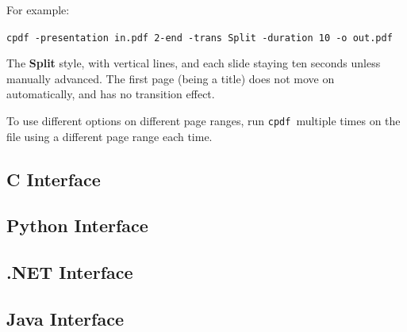 \documentclass{book}
\newcommand{\cpdf}{\texttt{cpdf}}
\begin{document}
\noindent For example:
\begin{framed}
  \small
  \noindent\verb!cpdf -presentation in.pdf 2-end -trans Split -duration 10 -o out.pdf!

  \vspace{2.5mm}
  \noindent The \textbf{Split} style, with vertical lines, and each slide staying ten
seconds unless manually advanced. The first page (being a title) does not move
on automatically, and has no transition effect.

\end{framed}

\noindent To use different options on different page ranges, run \cpdf\ multiple times on
the file using a different page range each time.

\begin{cpdflib}
\clearpage
\section*{C Interface}
\begin{small}\tt

\end{small}
\end{cpdflib}

\begin{pycpdflib}
\clearpage
\section*{Python Interface}
\begin{small}\tt

\end{small}
\end{pycpdflib}

\begin{dotnetcpdflib}
\clearpage
\section*{.NET Interface}
\begin{small}\tt

\end{small}
\end{dotnetcpdflib}

\begin{jcpdflib}
\clearpage
\section*{Java Interface}
\begin{small}\tt

\end{small}
\end{jcpdflib}
\end{document}
